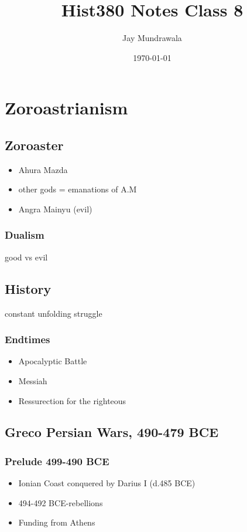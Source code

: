 \documentclass[11pt, a4paper]{article}
\begin{document}
\title{Hist380 Notes Class 8}
\author{Jay Mundrawala}
\date{\today}
\maketitle

\section{Zoroastrianism}
\subsection{Zoroaster}
\begin{itemize}
  \item Ahura Mazda
  \item other gods = emanations of A.M
  \item Angra Mainyu (evil)
\end{itemize}
\subsubsection{Dualism}
good vs evil
\subsection{History}
constant unfolding struggle
\subsubsection{Endtimes}
\begin{itemize}
  \item Apocalyptic Battle
  \item Messiah
  \item Ressurection for the righteous
\end{itemize}
\subsection{Greco Persian Wars, 490-479 BCE}
\subsubsection{Prelude 499-490 BCE}
\begin{itemize}
  \item Ionian Coast conquered by Darius I (d.485 BCE)
  \item 494-492 BCE-rebellions
  \item Funding from Athens
\end{itemize}
\end{document}
